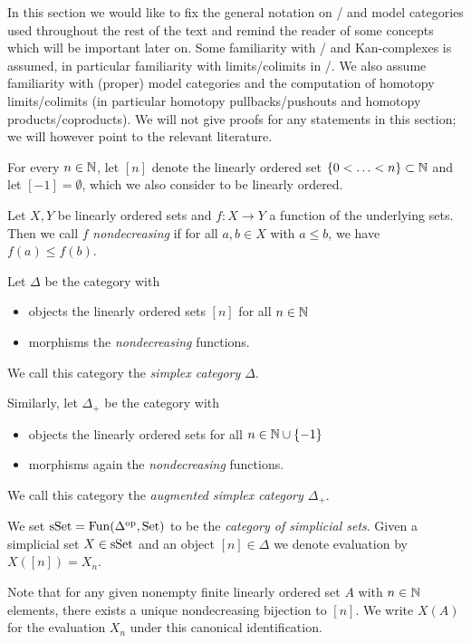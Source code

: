 In this section we would like to fix the general notation on \inftycats/ and model categories used throughout the rest of the text and remind the reader of some concepts which will be important later on.
Some familiarity with \inftycats/ and Kan-complexes is assumed, in particular familiarity with limits/colimits in \inftycats/.
We also assume familiarity with (proper) model categories and the computation of homotopy limits/colimits (in particular homotopy pullbacks/pushouts and homotopy products/coproducts).
We will not give proofs for any statements in this section; we will however point to the relevant literature.
\begin{definition}
    For every $n\in\mathbb{N}$, let $[n]$ denote the linearly ordered set $\left\lbrace0<\ldots<n\right\rbrace\subset\mathbb{N}$ and let $[-1]=\emptyset$, which we also consider to be linearly ordered.
\end{definition}
\begin{definition}
    Let $X,Y$ be linearly ordered sets and $f\colon X\to Y$ a function of the underlying sets.
    Then we call $f$ \emph{nondecreasing} if for all $a,b\in X$ with $a\leq b$, we have $f(a)\leq f(b)$.
\end{definition}
\begin{definition}
    Let $\Delta$ be the category with
    \begin{itemize}
        \item objects the linearly ordered sets $[n]$ for all $n\in\mathbb{N}$
        \item morphisms the \emph{nondecreasing} functions.
    \end{itemize}
    We call this category the \emph{simplex category $\Delta$}.

    Similarly, let $\Delta_+$ be the category with
    \begin{itemize}
        \item objects the linearly ordered sets for all $n\in\mathbb{N}\cup\left\lbrace-1\right\rbrace$ 
        \item morphisms again the \emph{nondecreasing} functions.
    \end{itemize}
    We call this category the \emph{augmented simplex category $\Delta_+$}.
\end{definition}
\begin{definition}
    We set $\operatorname{sSet}=\operatorname{Fun}(\Delta^{\operatorname{op}},\operatorname{Set})$ to be the \emph{category of simplicial sets}.
    Given a simplicial set $X\in\operatorname{sSet}$ and an object $[n]\in\Delta$ we denote evaluation by $X([n])=X_n$.

    Note that for any given nonempty finite linearly ordered set $A$ with $n\in\mathbb{N}$ elements, there exists a unique nondecreasing bijection to $[n]$.
    We write $X(A)$ for the evaluation $X_n$ under this canonical identification. 
\end{definition}
